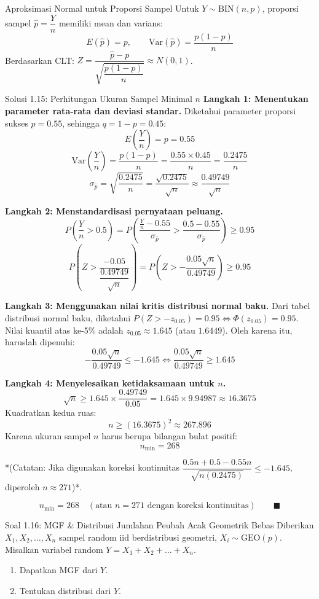 \documentclass[10pt,twoside]{article}
\begin{document}
\begin{tipbox}{Aproksimasi Normal untuk Proporsi Sampel}
Untuk $Y \sim \text{BIN}(n, p)$, proporsi sampel $\hat{p} = \dfrac{Y}{n}$ memiliki mean dan varians:
\[
E(\hat{p}) = p, \qquad \mathrm{Var}(\hat{p}) = \frac{p(1-p)}{n}
\]
Berdasarkan CLT: $Z = \dfrac{\hat{p} - p}{\sqrt{\dfrac{p(1-p)}{n}}} \approx N(0, 1)$.
\end{tipbox}

\begin{solbox}{Solusi 1.15: Perhitungan Ukuran Sampel Minimal $n$}
\textbf{Langkah 1: Menentukan parameter rata-rata dan deviasi standar.}
Diketahui parameter proporsi sukses $p = 0.55$, sehingga $q = 1 - p = 0.45$:
\[
E\left(\frac{Y}{n}\right) = p = 0.55
\]
\[
\mathrm{Var}\left(\frac{Y}{n}\right) = \frac{p(1-p)}{n} = \frac{0.55 \times 0.45}{n} = \frac{0.2475}{n}
\]
\[
\sigma_{\hat{p}} = \sqrt{\frac{0.2475}{n}} = \frac{\sqrt{0.2475}}{\sqrt{n}} \approx \frac{0.49749}{\sqrt{n}}
\]

\textbf{Langkah 2: Menstandardisasi pernyataan peluang.}
\[
P\left(\frac{Y}{n} > 0.5\right) = P\left(\frac{\frac{Y}{n} - 0.55}{\sigma_{\hat{p}}} > \frac{0.5 - 0.55}{\sigma_{\hat{p}}}\right) \ge 0.95
\]
\[
P\left(Z > \frac{-0.05}{\dfrac{0.49749}{\sqrt{n}}}\right) = P\left(Z > - \frac{0.05 \sqrt{n}}{0.49749}\right) \ge 0.95
\]

\textbf{Langkah 3: Menggunakan nilai kritis distribusi normal baku.}
Dari tabel distribusi normal baku, diketahui $P(Z > -z_{0.05}) = 0.95 \iff \Phi(z_{0.05}) = 0.95$.
Nilai kuantil atas ke-5\% adalah $z_{0.05} \approx 1.645$ (atau $1.6449$).
Oleh karena itu, haruslah dipenuhi:
\[
-\frac{0.05 \sqrt{n}}{0.49749} \le -1.645 \iff \frac{0.05 \sqrt{n}}{0.49749} \ge 1.645
\]

\textbf{Langkah 4: Menyelesaikan ketidaksamaan untuk $n$.}
\[
\sqrt{n} \ge 1.645 \times \frac{0.49749}{0.05} = 1.645 \times 9.94987 \approx 16.3675
\]
Kuadratkan kedua ruas:
\[
n \ge (16.3675)^2 \approx 267.896
\]
Karena ukuran sampel $n$ harus berupa bilangan bulat positif:
\[
n_{\min} = 268
\]

*(Catatan: Jika digunakan koreksi kontinuitas $\dfrac{0.5n + 0.5 - 0.55n}{\sqrt{n(0.2475)}} \le -1.645$, diperoleh $n \approx 271$)*.

\[
\boxed{n_{\min} = 268 \quad (\text{atau } n = 271 \text{ dengan koreksi kontinuitas}) } \qquad \blacksquare
\]
\end{solbox}

\begin{soalbox}{Soal 1.16: MGF \& Distribusi Jumlahan Peubah Acak Geometrik Bebas}
Diberikan $X_1, X_2, \dots, X_n$ sampel random iid berdistribusi geometri, $X_i \sim \text{GEO}(p)$. Misalkan variabel random $Y = X_1 + X_2 + \dots + X_n$.
\begin{enumerate}[label=(\alph*)]
  \item Dapatkan MGF dari $Y$.
  \item Tentukan distribusi dari $Y$.
\end{enumerate}
\end{soalbox}
\end{document}
